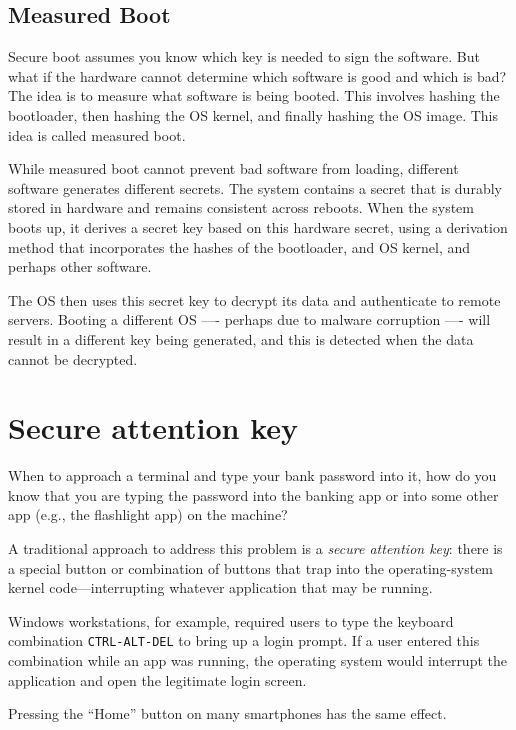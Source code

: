 \subsection{Measured Boot}

Secure boot assumes you know which key is needed to sign the software. But what if the hardware cannot determine which software is good and which is bad? The idea is to measure what software is being booted. This involves hashing the bootloader, then hashing the OS kernel, and finally hashing the OS image. This idea is called measured boot.

While measured boot cannot prevent bad software from loading, different software generates different secrets. The system contains a secret that is durably stored in hardware and remains consistent across reboots. When the system boots up, it derives a secret key based on this hardware secret, using a derivation method that incorporates the hashes of the bootloader, and OS kernel, and perhaps other software.

The OS then uses this secret key to decrypt its data and authenticate to remote servers. Booting a different OS —- perhaps due to malware corruption —- will result in a different key being generated, and this is detected when the data cannot be decrypted.

\section{Secure attention key}

When to approach a terminal and type your bank password into it,
how do you know that you are typing the password into 
the banking app or into some other app (e.g., the flashlight app)
on the machine?

A traditional approach to address this problem is a
\emph{secure attention key}: there is a special button
or combination of buttons that trap into the operating-system
kernel code---interrupting whatever application that may
be running.

Windows workstations, for example, required users to 
type the keyboard combination \texttt{CTRL-ALT-DEL} to
bring up a login prompt.
If a user entered this combination while an app was
running, the operating system would interrupt the
application and open the legitimate login screen.

Pressing the ``Home'' button on many smartphones 
has the same effect.
